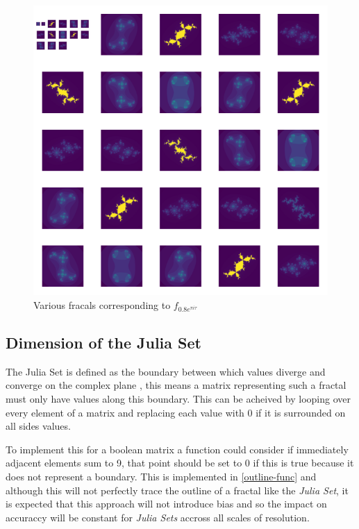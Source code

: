 \documentclass[a4paper,11pt,twoside]{article}
\begin{document}
\begin{figure}[htbp]
\centering
\includegraphics[width=1.0\textwidth]{media/Outline/many_julia_fractals_around_circle.png}
\caption{\label{montage-frac}Various fracals corresponding to \(f_{0.8 e^{\pi i \tau}}\)}
\end{figure}

\subsection{Dimension of the Julia Set}
\label{dim-julia}
The Julia Set is defined as the boundary between which values diverge and
converge on the complex plane
\cite[\S 14.1]{falconerFractalGeometryMathematical2003b}, this means a matrix
representing such a fractal must only have values along this boundary. This can
be acheived by looping over every element of a matrix and replacing each value
with 0 if it is surrounded on all sides values.

To implement this for a boolean matrix a function could consider if immediately
adjacent elements sum to 9, that point should be set to 0 if this is true
because it does not represent a boundary. This is implemented in \ref{outline-func}
and although this will not perfectly trace the outline of a fractal like the
\emph{Julia Set}, it is expected that this approach will not introduce bias and so
the impact on accuraccy will be constant for \emph{Julia Sets} accross all scales of
resolution.
\end{document}
